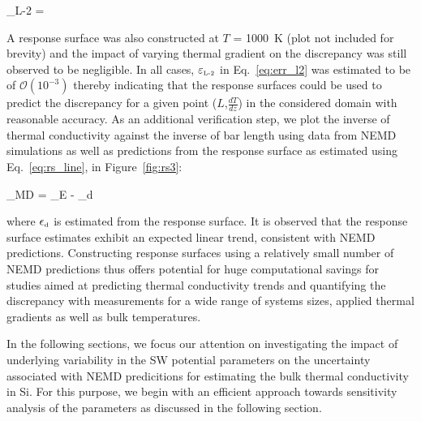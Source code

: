  \be
 \varepsilon_{\tiny{\mbox{L-2}}} =  
 \label{eq:err_l2}
 \ee
 
 A response surface was also constructed at $T$ = 1000~K (plot not included for brevity) and the impact of
 varying thermal gradient on the discrepancy was still observed to be negligible. In all cases,
 $\varepsilon_{\tiny{\mbox{L-2}}}$ in Eq.~\ref{eq:err_l2} was estimated to be of $\mathcal{O}(10^{-3})$ thereby
 indicating that the response surfaces could be used to predict the discrepancy for a given
 point ($L$,$\frac{dT}{dz}$) in the considered domain with reasonable accuracy. As an additional verification
 step, we plot the inverse of thermal conductivity against the inverse of bar length using data from NEMD
 simulations as well as predictions from the response surface as estimated using Eq.~\ref{eq:rs_line}, 
 in Figure~\ref{fig:rs3}:
 
 \be
\kappa_{\mbox{\tiny{MD}}} =  \kappa_{\mbox{\tiny{E}}} - \epsilon_{\mbox{\tiny{d}}} 
 \label{eq:rs_line}
 \ee
 
 \noindent where $\epsilon_{\mbox{\tiny{d}}}$ is estimated from the response surface. 
 It is observed that the response surface estimates exhibit an expected linear trend, consistent with NEMD
  predictions. Constructing response surfaces using a relatively small number of NEMD predictions thus offers
  potential for huge computational savings for studies aimed at predicting thermal conductivity trends and 
  quantifying the discrepancy with measurements for a wide range of systems sizes, applied thermal gradients as 
  well as bulk temperatures.

In the following sections, we focus our attention on investigating the impact of underlying variability
in the SW potential parameters on the uncertainty associated with NEMD predicitions for estimating the bulk
thermal conductivity in Si.
For this purpose, we begin with an efficient approach towards sensitivity analysis of the parameters as
discussed in the following section.  
 





































